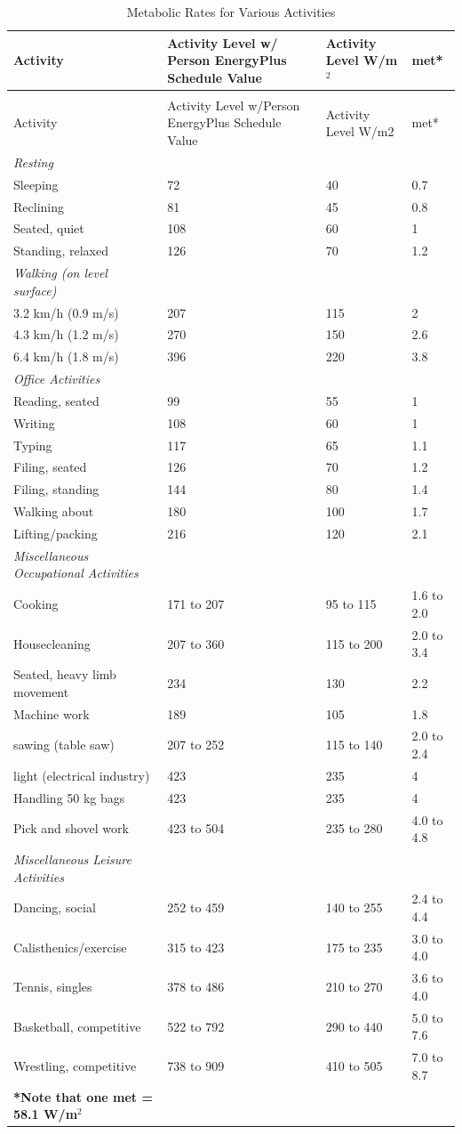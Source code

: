 \begin{longtable}[c]{p{2.0in}p{1.34in}p{1.33in}p{1.33in}}
\caption{Metabolic Rates for Various Activities \label{table:metabolic-rates-for-various-activities}} \tabularnewline
\toprule 
Activity & Activity Level w/ Person EnergyPlus Schedule Value & Activity Level W/m\(^2\) & met* \tabularnewline
\midrule
\endfirsthead

\caption[]{Metabolic Rates for Various Activities} \tabularnewline
\toprule 
Activity & Activity Level w/Person EnergyPlus Schedule Value & Activity Level W/m2 & met* \tabularnewline
\midrule
\endhead

\emph{Resting} \tabularnewline \midrule 
Sleeping & 72 & 40 & 0.7 \tabularnewline
Reclining & 81 & 45 & 0.8 \tabularnewline
Seated, quiet & 108 & 60 & 1 \tabularnewline
Standing, relaxed & 126 & 70 & 1.2 \tabularnewline
\emph{Walking (on level surface)} \tabularnewline \midrule
3.2 km/h (0.9 m/s) & 207 & 115 & 2 \tabularnewline
4.3 km/h (1.2 m/s) & 270 & 150 & 2.6 \tabularnewline
6.4 km/h (1.8 m/s) & 396 & 220 & 3.8 \tabularnewline
\emph{Office Activities} \tabularnewline \midrule
Reading, seated & 99 & 55 & 1 \tabularnewline
Writing & 108 & 60 & 1 \tabularnewline
Typing & 117 & 65 & 1.1 \tabularnewline
Filing, seated & 126 & 70 & 1.2 \tabularnewline
Filing, standing & 144 & 80 & 1.4 \tabularnewline
Walking about & 180 & 100 & 1.7 \tabularnewline
Lifting/packing & 216 & 120 & 2.1 \tabularnewline
\emph{Miscellaneous Occupational Activities} \tabularnewline \midrule
Cooking & 171 to 207 & 95 to 115 & 1.6 to 2.0 \tabularnewline
Housecleaning & 207 to 360 & 115 to 200 & 2.0 to 3.4 \tabularnewline
Seated, heavy limb movement & 234 & 130 & 2.2 \tabularnewline
Machine work & 189 & 105 & 1.8 \tabularnewline
sawing (table saw) & 207 to 252 & 115 to 140 & 2.0 to 2.4 \tabularnewline
light (electrical industry) & 423 & 235 & 4 \tabularnewline
Handling 50 kg bags & 423 & 235 & 4 \tabularnewline
Pick and shovel work & 423 to 504 & 235 to 280 & 4.0 to 4.8 \tabularnewline
\emph{Miscellaneous Leisure Activities} \tabularnewline \midrule
Dancing, social & 252 to 459 & 140 to 255 & 2.4 to 4.4 \tabularnewline
Calisthenics/exercise & 315 to 423 & 175 to 235 & 3.0 to 4.0 \tabularnewline
Tennis, singles & 378 to 486 & 210 to 270 & 3.6 to 4.0 \tabularnewline
Basketball, competitive & 522 to 792 & 290 to 440 & 5.0 to 7.6 \tabularnewline
Wrestling, competitive & 738 to 909 & 410 to 505 & 7.0 to 8.7 \tabularnewline
\bottomrule
\scriptsize
\textbf{*Note that one met = 58.1 W/m\(^{2}\)}
\end{longtable}


